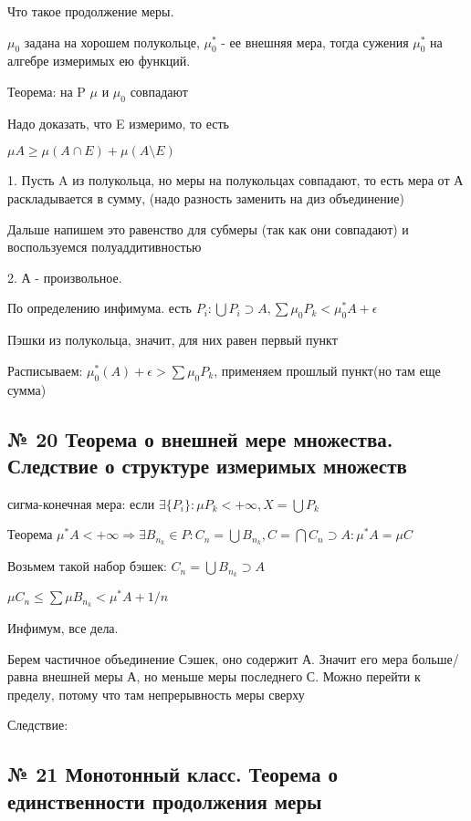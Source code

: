 \documentclass{article}
\begin{document}
Что такое продолжение меры.

$\mu_0$ задана на хорошем полукольце, $\mu_0^*$ - ее внешняя мера, тогда сужения $\mu_0^*$ на алгебре измеримых ею функций. 

Теорема: на P $\mu$ и $\mu_0$ совпадают

Надо доказать, что E измеримо, то есть

$\mu A \geq \mu (A \cap E) + \mu (A \setminus E)$

1. Пусть A из полукольца, но меры на полукольцах совпадают, то есть мера от А раскладывается в сумму, (надо разность заменить на диз объединение)

Дальше напишем это равенство для субмеры (так как они совпадают) и воспользуемся полуаддитивностью

2. А - произвольное. 

По определению инфимума. есть $P_i : \bigcup{P_i} \supset A, \sum{\mu_0P_k} < \mu_0^* A + \epsilon$

Пэшки из полукольца, значит, для них равен первый пункт

Расписываем: $\mu_0^*(A) + \epsilon > \sum{\mu_0 P_k}$, применяем прошлый пункт(но там еще сумма)


\subsection{ \footnotesize № 20 Теорема о внешней мере множества. Следствие о структуре измеримых множеств}

сигма-конечная мера: если $\exists \{P_i\} : \mu P_k < + \infty, X = \bigcup{P_k}$

Теорема $\mu^* A < +\infty \Rightarrow \exists B_{n_k} \in P : C_n = \bigcup{B_{n_k}}, C = \bigcap{C_n} \supset A : \mu^* A = \mu C$

Возьмем такой набор бэшек: $C_n = \bigcup{B_{n_k}} \supset A$

$\mu C_n \leq \sum{\mu B_{n_k}} < \mu^* A + 1/n$

Инфимум, все дела.

Берем частичное объединение Сэшек, оно содержит А. Значит его мера больше/равна внешней меры А, но меньше  меры последнего С. Можно перейти к пределу, потому что там непрерывность меры сверху

Следствие:

\subsection{ \footnotesize № 21 Монотонный класс. Теорема о единственности продолжения меры}
\end{document}
